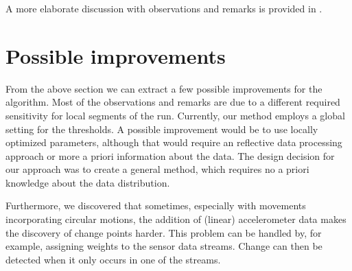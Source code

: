 A more elaborate discussion with observations and remarks is provided in .

\section{Possible improvements}\label{sec:possible_improvements}
From the above section we can extract a few possible improvements for the algorithm.
Most of the observations and remarks are due to a different required sensitivity for local segments of the run.
Currently, our method employs a global setting for the thresholds.
A possible improvement would be to use locally optimized parameters, although that would require an reflective data processing approach or more a priori information about the data.
The design decision for our approach was to create a general method, which requires no a priori knowledge about the data distribution.

Furthermore, we discovered that sometimes, especially with movements incorporating circular motions, the addition of (linear) accelerometer data makes the discovery of change points harder.
This problem can be handled by, for example, assigning weights to the sensor data streams.
Change can then be detected when it only occurs in one of the streams.